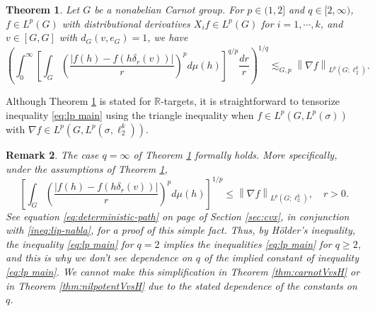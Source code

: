 \documentclass[11pt,reqno]{amsart}
\newtheorem{theorem}{Theorem}
\newtheorem{remark}[theorem]{Remark}
\newcommand{\1}{\mathbf 1}
\begin{document}
\begin{theorem}\label{thm:lp}
Let $G$ be a nonabelian Carnot group.
For $p\in (1,2]$ and $q\in [2,\infty)$, $f\in L^p\left(G\right)$ with distributional derivatives $X_i f \in L^p\left(G\right)$ for $i=1,\cdots,k$, and $v\in \left[G,G\right]$ with $d_G\left(v,e_G\right)= 1$, we have
\begin{equation}\label{eq:lp main}
\left(\int_0^\infty \left[ \int_G \left(\frac{\left|f\left(h\right) - f\left(h\delta_r\left(v\right)\right)\right|}{r} \right)^p d\mu\left(h\right)\right]^{q/p}  \frac{dr}{r} \right)^{1/q} \lesssim_{G,p} \left\|\nabla f\right\|_{L^p\left(G;\ell_2^k\right)}.
\end{equation}
\end{theorem}

Although Theorem \ref{thm:lp} is stated for $\mathbb{R}$-targets, it is straightforward to tensorize inequality \eqref{eq:lp main} using the triangle inequality when $f\in L^p\left(G,L^p\left(\sigma\right)\right)$ with $\nabla f\in L^p\left(G,L^p\left(\sigma,\ell_2^k\right)\right)$.

\begin{remark}\label{qge2}
The case $q=\infty$ of Theorem \ref{thm:lp} formally holds. More specifically, under the assumptions of Theorem \ref{thm:lp},
\begin{equation}\label{eq:qinfty-carnot}
\left[ \int_G \left(\frac{\left|f\left(h\right) - f\left(h\delta_r\left(v\right)\right)\right|}{r} \right)^p d\mu\left(h\right)\right]^{1/p}\le \left\|\nabla f\right\|_{L^p\left(G;\ell_2^k\right)},\quad r>0.
\end{equation}
See equation \eqref{eq:deterministic-path} on page \pageref{proofrmkqge2} of Section \ref{sec:cvx}, in conjunction with \eqref{ineq:lip-nabla}, for a proof of this simple fact.
Thus, by H\"older's inequality, the inequality \eqref{eq:lp main} for $q=2$ implies the inequalities \eqref{eq:lp main} for $q\ge 2$, and this is why we don't see dependence on $q$ of the implied constant of inequality \eqref{eq:lp main}.  We cannot make this simplification in Theorem \ref{thm:carnotVvsH} or in Theorem \ref{thm:nilpotentVvsH} due to the stated dependence of the constants on $q$.
\end{remark}
\end{document}

